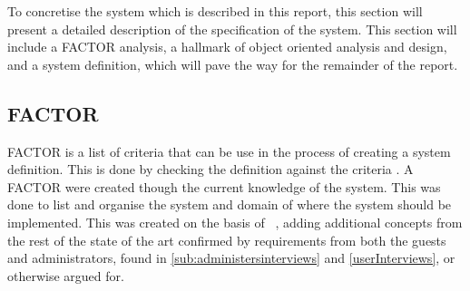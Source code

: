 To concretise the system which is described in this report, this section will present a detailed description of the specification of the system. This section will include a FACTOR analysis, a hallmark of object oriented analysis and design, and a system definition, which will pave the way for the remainder of the report.

\subsection{FACTOR}
\label{FACTOR}
FACTOR is a list of criteria that can be use in the process of creating a system definition. This is done by checking the definition against the criteria \cite{mathiassen2001objektorienteret}. A FACTOR were created though the current knowledge of the system. This was done to list and organise the system and domain of where the system should be implemented.
This was created on the basis of ~\cite{sorensen2012}, adding additional concepts from the rest of the state of the art confirmed by requirements from both the guests and administrators, found in \cref{sub:administersinterviews} and \cref{userInterviews}, or otherwise argued for.
